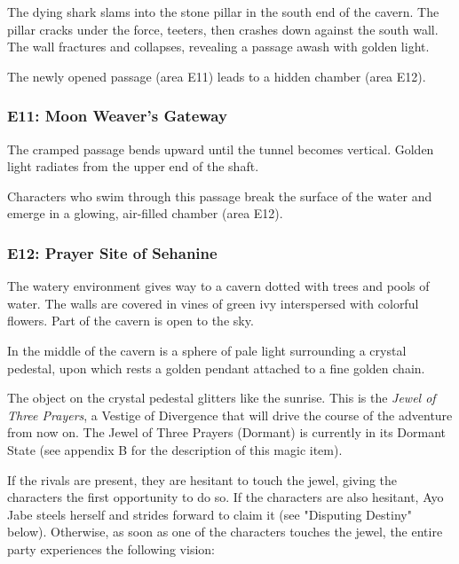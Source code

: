 \documentclass[10pt,a4paper,twoside,fancy,bg=print,twocolumn,openany,nodeprecatedcode]{dndbook}
\begin{document}
\begin{DndReadAloud}{}
The dying shark slams into the stone pillar in the south end of the cavern. The pillar cracks under the force, teeters, then crashes down against the south wall. The wall fractures and collapses, revealing a passage awash with golden light.

\end{DndReadAloud}

The newly opened passage (area E11) leads to a hidden chamber (area E12).

\subsubsection{E11: Moon Weaver's Gateway}
\begin{DndReadAloud}{}
The cramped passage bends upward until the tunnel becomes vertical. Golden light radiates from the upper end of the shaft.

\end{DndReadAloud}

Characters who swim through this passage break the surface of the water and emerge in a glowing, air-filled chamber (area E12).

\subsubsection{E12: Prayer Site of Sehanine}
\begin{DndReadAloud}{}
The watery environment gives way to a cavern dotted with trees and pools of water. The walls are covered in vines of green ivy interspersed with colorful flowers. Part of the cavern is open to the sky.

In the middle of the cavern is a sphere of pale light surrounding a crystal pedestal, upon which rests a golden pendant attached to a fine golden chain.

\end{DndReadAloud}

The object on the crystal pedestal glitters like the sunrise. This is the \textit{Jewel of Three Prayers}, a Vestige of Divergence that will drive the course of the adventure from now on. The Jewel of Three Prayers (Dormant) is currently in its Dormant State (see appendix B for the description of this magic item).

If the rivals are present, they are hesitant to touch the jewel, giving the characters the first opportunity to do so. If the characters are also hesitant, Ayo Jabe steels herself and strides forward to claim it (see "Disputing Destiny" below). Otherwise, as soon as one of the characters touches the jewel, the entire party experiences the following vision:
\end{document}
